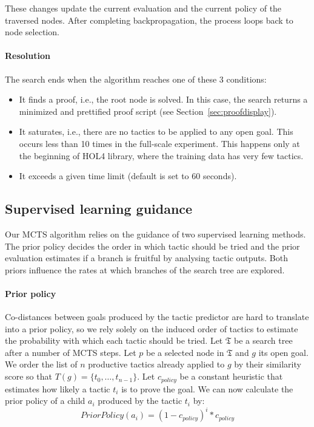 \documentclass[runningheads,a4paper,draft]{svjour3}
\def\holfour{\textsf{HOL4}\xspace}
\begin{document}
These changes update the current evaluation and the current policy of the
traversed nodes.
After completing backpropagation, the process loops back to node
selection.

\paragraph{Resolution}
The search ends when the algorithm reaches one of these 3 conditions:
\begin{itemize}
\item It finds a proof, i.e., the root node is solved. In this case,
the search returns a minimized and
prettified proof script (see Section~\ref{sec:proofdisplay}).
\item It saturates, i.e., there are no tactics to be applied to any open goal.
This occurs less than 10 times in the full-scale experiment.
This happens only at the beginning of \holfour library, where the training data
has very few tactics.
\item It exceeds a given time limit (default is set to 60 seconds).
\end{itemize}

\subsection{Supervised learning guidance}
Our MCTS algorithm relies on the guidance of two supervised learning methods.
The prior policy decides the order in which tactic should be tried and the
prior evaluation estimates if a branch is fruitful by analysing tactic
outputs. Both priors influence the rates at which branches of the search tree
are explored.

\paragraph{Prior policy}\label{sec:policy}
Co-distances between goals produced by the tactic predictor are hard
to translate into a prior policy, so we rely solely on the induced order of
tactics to estimate the probability with which each tactic should be tried.
Let $\mathfrak{T}$ be a search tree after a number of MCTS steps.
Let $p$ be a selected node in $\mathfrak{T}$ and $g$ its open goal. We order
the list of $n$ productive tactics already
applied to $g$ by their similarity score so that $T(g)= \lbrace
t_0,\ldots,t_{n-1} \rbrace$.
Let $c_{policy}$ be a constant heuristic that estimates how likely a tactic
$t_i$ is to prove the goal.
We can now calculate the prior policy of a child $a_i$ produced by the tactic
$t_i$ by:
\[PriorPolicy(a_i) = (1 - c_{policy})^{i} * c_{policy}\]
\end{document}
